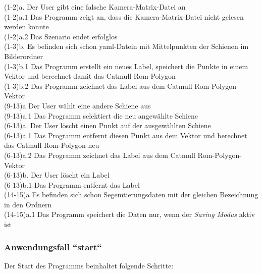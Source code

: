 \noindent
(1-2)a. Der User gibt eine falsche Kamera-Matrix-Datei an
\\ 
\noindent
(1-2)a.1 Das Programm zeigt an, dass die Kamera-Matrix-Datei nicht gelesen werden konnte
\\ 
\noindent
(1-2)a.2 Das Szenario endet erfolglos
\\ 

\noindent
(1-3)b. Es befinden sich schon yaml-Datein mit Mittelpunkten der Schienen im Bilderordner
\\ 
\noindent
(1-3)b.1  Das Programm erstellt ein neues Label, speichert die Punkte in einem Vektor und berechnet damit das Catmull Rom-Polygon
\\ 
\noindent
(1-3)b.2 Das Programm zeichnet das Label aus dem Catmull Rom-Polygon-Vektor
\\

\noindent
(9-13)a Der User wählt eine andere Schiene aus
\\ 
\noindent
(9-13)a.1 Das Programm selektiert die neu angewählte Schiene
\\

\noindent
(6-13)a. Der User löscht einen Punkt auf der ausgewählten Schiene
\\ 
\noindent
(6-13)a.1 Das Programm entfernt diesen Punkt aus dem Vektor und berechnet das Catmull Rom-Polygon neu
\\ 
\noindent
(6-13)a.2 Das Programm zeichnet das Label aus dem Catmull Rom-Polygon-Vektor
\\ 

\noindent
(6-13)b. Der User löscht ein Label
\\ 
\noindent
(6-13)b.1 Das Programm entfernt das Label 
\\ 

\noindent
(14-15)a Es befinden sich schon Segemtierungsdaten mit der gleichen Bezeichnung in den Ordnern
\\ 
\noindent
(14-15)a.1 Das Programm speichert die Daten nur, wenn der \textit{Saving Modus} aktiv ist

\subsubsection{Anwendungsfall ``start``}
\label{sec:Anwendungsfall ``start``}

Der Start des Programms beinhaltet folgende Schritte:
\\

